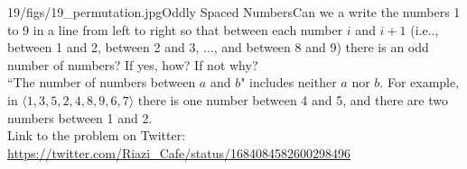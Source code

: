 \begin{problem}{19/figs/19_permutation.jpg}{Oddly Spaced Numbers}Can we a write the numbers 1 to 9 in a line from left to right  so that between each number $i$ and $i+1$ (i.e.., between 1 and 2, between 2 and 3, $\ldots$, and between 8 and 9) there is an odd number of numbers? If yes, how? If not why?\\[0.2cm]

``The number of numbers between $a$ and $b$" includes neither $a$ nor $b$. For example, in $\langle 1,3,5,2,4,8,9,6,7 \rangle$ there is one number between 4 and 5, and there are two numbers between 1 and 2.\\[0.2cm]

Link to the problem on Twitter:  \url{https://twitter.com/Riazi_Cafe/status/1684084582600298496}\end{problem}